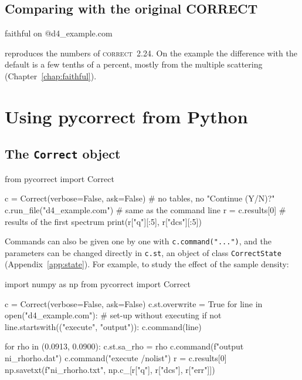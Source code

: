 \documentclass[11pt,a4paper]{report}
\newcommand{\code}[1]{\texttt{#1}}
\newcommand{\cor}{\textsc{correct}}
\begin{document}
\section{Comparing with the original CORRECT}

\begin{com}
faithful on
@d4_example.com
\end{com}
reproduces the numbers of \cor\ 2.24. On the example the difference with the
default is a few tenths of a percent, mostly from the multiple scattering
(Chapter~\ref{chap:faithful}).

\chapter{Using pycorrect from Python}
\label{chap:python}

\section{The \code{Correct} object}

\begin{py}
from pycorrect import Correct

c = Correct(verbose=False, ask=False)   # no tables, no "Continue (Y/N)?"
c.run_file("d4_example.com")            # same as the command line
r = c.results[0]                        # results of the first spectrum
print(r["q"][:5], r["dcs"][:5])
\end{py}

Commands can also be given one by one with \code{c.command("...")}, and the
parameters can be changed directly in \code{c.st}, an object of class
\code{CorrectState} (Appendix~\ref{app:state}). For example, to study the effect
of the sample density:

\begin{py}
import numpy as np
from pycorrect import Correct

c = Correct(verbose=False, ask=False)
c.st.overwrite = True
for line in open("d4_example.com"):          # set-up without executing
    if not line.startswith(("execute", "output")):
        c.command(line)

for rho in (0.0913, 0.0900):
    c.st.sa_rho = rho
    c.command(f"output ni_rho{rho}.dat")
    c.command("execute /nolist")
    r = c.results[0]
    np.savetxt(f"ni_rho{rho}.txt", np.c_[r["q"], r["dcs"], r["err"]])
\end{py}
\end{document}
